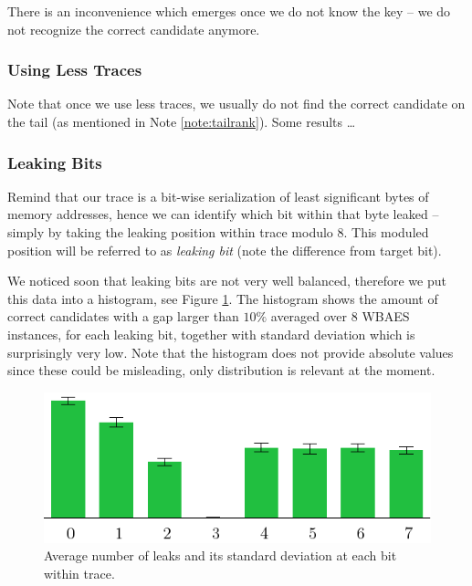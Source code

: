 	There is an inconvenience which emerges once we do not know the key -- we do not recognize the correct candidate anymore.
	

\subsubsection{Using Less Traces}
	
	Note that once we use less traces, we usually do not find the correct candidate on the tail (as mentioned in Note \ref{note:tailrank}). Some results \ldots %

\subsubsection{Leaking Bits}
	
	Remind that our trace is a bit-wise serialization of least significant bytes of memory addresses, hence we can identify which bit within that byte leaked -- simply by taking the leaking position within trace modulo $8$. This moduled position will be referred to as {\em leaking bit} (note the difference from target bit).
	
	We noticed soon that leaking bits are not very well balanced, therefore we put this data into a histogram, see Figure \ref{fig:leakbitall}. The histogram shows the amount of correct candidates with a gap larger than $10\%$ averaged over $8$ WBAES instances, for each leaking bit, together with standard deviation which is surprisingly very low. Note that the histogram does not provide absolute values since these could be misleading, only distribution is relevant at the moment.
	
	\begin{figure}[h]
	\begin{center}
		\includegraphics{figures/leak_bit/leak_bit.pdf}
		\caption{Average number of leaks and its standard deviation at each bit within trace.}
		\label{fig:leakbitall}
	\end{center}
	\end{figure}
	
